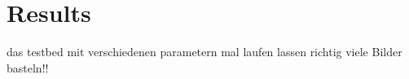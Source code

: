 \chapter{Results}

das testbed mit verschiedenen parametern mal laufen lassen
richtig viele Bilder basteln!!

